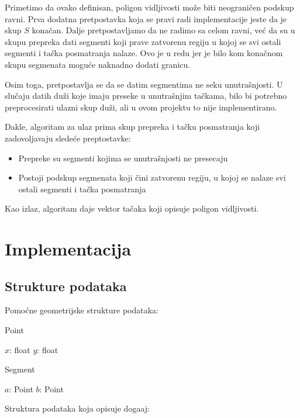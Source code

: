 \documentclass{article}
\newcommand{\Proc}[1]{\textsf{#1}}                     %
\begin{document}
Primetimo da ovako definisan, poligon vidljivosti može biti neograničen podskup ravni. Prva dodatna pretpostavka koja se pravi radi implementacije jeste da je skup $S$ kona\v can. Dalje pretpostavljamo da ne radimo sa celom ravni, već da su u skupu prepreka dati segmenti koji prave zatvorenu regiju u kojoj se svi ostali segmenti i ta\v cka posmatranja nalaze. Ovo je u redu jer je bilo kom kona\v cnom skupu segmenata moguće naknadno dodati granicu.

Osim toga, pretpostavlja se da  se datim segmentima ne seku unutrašnjosti. U slučaju datih duži koje imaju preseke u unutrašnjim tačkama, bilo bi potrebno preprocesirati ulazni skup du\v zi, ali u ovom projektu to nije implementirano.

Dakle, algoritam za ulaz prima skup prepreka i tačku posmatranja koji zadovoljavaju sledeće preptostavke:
\begin{itemize}
    \item Prepreke su segmenti kojima se unutrašnjosti ne presecaju
    \item Postoji podskup segmenata koji čini zatvorenu regiju, u kojoj se nalaze svi ostali segmenti i ta\v cka posmatranja
\end{itemize}

Kao izlaz, algoritam daje vektor tačaka koji opisuje poligon vidljivosti.


\section{Implementacija}

\subsection{Strukture podataka}

Pomo\' cne geometrijske strukture podataka:
\begin{structbox}{\Proc{Point}}
\begin{algorithmic}
        \State $x$: float
        \State $y$: float
\end{algorithmic}
\end{structbox}

\begin{structbox}{\Proc{Segment}}
\begin{algorithmic}
        \State $a$: Point
        \State $b$: Point
\end{algorithmic}
\end{structbox}

Struktura podataka koja opisuje doga\dj aj:
\end{document}
